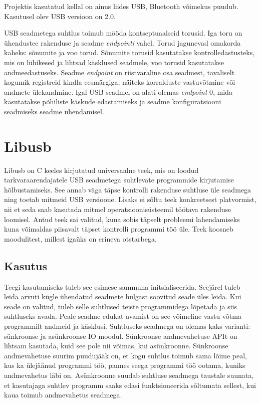 
Projektis kasutatud kellal on ainus liides USB, Bluetooth võimekus puudub.
Kasutusel olev USB versioon on 2.0.

USB seadmetega suhtlus toimub mööda kontseptuaalseid torusid.
Iga toru on ühendustee rakenduse ja seadme \textit{endpointi} vahel.
Torud jagunevad omakorda kaheks: sõnumite ja voo torud.
Sõnumite torusid kasutatakse kontrolledastusteks, mis on lühikesed ja lihtsad käsklused seadmele, voo torusid kasutatakse andmeedastuseks.\cite{dreamincode}
Seadme \textit{endpoint} on riistvaraline osa seadmest, tavaliselt kogumik registreid kindla eesmärgiga, näiteks korralduste vastuvõtmine või andmete ülekandmine.\cite{endpoints}
Igal USB seadmel on alati olemas \textit{endpoint} 0, mida kasutatakse põhiliste käskude edastamiseks ja seadme konfiguratsiooni seadmiseks seadme ühendamisel.


\section{Libusb}\label{sec:libusb}
Libusb on C keeles kirjutatud universaalne teek, mis on loodud tarkvaraarendajatele USB seadmetega suhtlevate programmide kirjutamise hõlbustamiseks.
See annab väga täpse kontrolli rakenduse suhtluse üle seadmega ning toetab mitmeid USB versioone.
Lisaks ei sõltu teek konkreetsest platvormist, nii et seda saab kasutada mitmel operatsioonisüsteemil töötava rakenduse loomisel.
Antud teek sai valitud, kuna sobis täpselt probleemi lahendamiseks kuna võimaldas piisavalt täpset kontrolli programmi töö üle.\cite{libusb}
Teek koosneb moodulitest, millest igaüks on erineva otstarbega.

\subsection{Kasutus}
Teegi kasutamiseks tuleb see esimese sammuna initsialiseerida.
Seejärel tuleb leida arvuti kügle ühendatud seadmete hulgast soovitud seade üles leida.
Kui seade on valitud, tuleb selle suhtlused teiste programmidega lõpetada ja siis suhtluseks avada.
Peale seadme edukat avamist on see võimeline vastu võtma programmilt andmeid ja käsklusi.
Suhtluseks seadmega on olemas kaks varianti: sünkroonse ja asünkroonse IO moodul.
Sünkroonse andmevahetuse APIt on lihtsam kasutada, kuid see pole nii võimas, kui asünkroonne.
Sünkroonse andmevahetuse suurim puudujääk on, et kogu suhtlus toimub sama lõime peal, kus ka ülejäänud programmi töö, pannes seega programmi töö ootama, kuniks andmevahetus läbi on.
Asünkroonne suudab suhtluse seadmega taustale suunata, et kasutajaga suhtlev programm saaks edasi funktsioneerida sõltumata sellest, kui kaua toimub andmevahetus seadmega. 


